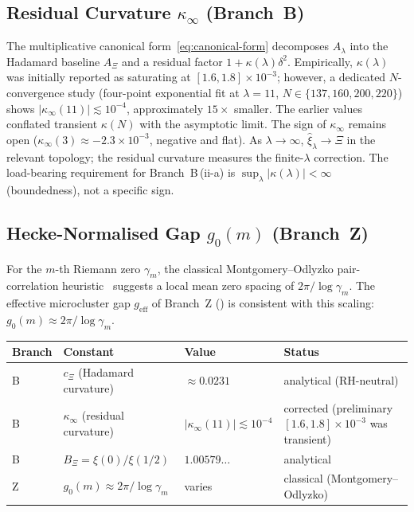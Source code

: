 \documentclass[12pt,a4paper]{article}
\theoremstyle{definition}
\theoremstyle{remark}
\begin{document}
\subsection{\texorpdfstring{Residual Curvature $\kappa_\infty$ (Branch~B)}{Residual Curvature kappa-infinity (Branch B)}}

The multiplicative canonical form~\eqref{eq:canonical-form} decomposes
$A_\lambda$ into the Hadamard baseline $A_\Xi$ and a residual factor
$1+\kappa(\lambda)\delta^2$. Empirically,
$\kappa(\lambda)$ was initially reported as saturating at
$[1.6,1.8]\times 10^{-3}$; however, a dedicated $N$-convergence study
(four-point exponential fit at $\lambda=11$, $N\in\{137,160,200,220\}$)
shows $|\kappa_\infty(11)|\lesssim 10^{-4}$, approximately $15\times$
smaller. The earlier values conflated transient $\kappa(N)$ with the
asymptotic limit. The sign of $\kappa_\infty$ remains open
($\kappa_\infty(3)\approx -2.3\times10^{-3}$, negative and flat).
As $\lambda\to\infty$, $\hat\xi_\lambda \to \Xi$ in the relevant
topology; the residual curvature measures the
finite-$\lambda$ correction. The load-bearing requirement for
Branch~B\,(ii-a) is $\sup_\lambda|\kappa(\lambda)|<\infty$
(boundedness), not a specific sign.

\subsection{\texorpdfstring{Hecke-Normalised Gap $g_0(m)$ (Branch~Z)}{Hecke-Normalised Gap g0(m) (Branch Z)}}

For the $m$-th Riemann zero $\gamma_m$, the classical
Montgomery--Odlyzko pair-correlation heuristic~\cite{Montgomery1973}
suggests a local mean zero spacing of
$2\pi/\log\gamma_m$. The effective microcluster gap
$g_{\text{eff}}$ of Branch~Z () is
consistent with this scaling:
$g_0(m) \approx 2\pi/\log\gamma_m$.

\begin{center}
\small
\renewcommand{\arraystretch}{1.2}
\begin{tabular}{llll}
\toprule
\textbf{Branch} & \textbf{Constant} & \textbf{Value} & \textbf{Status} \\
\midrule
B & $c_\Xi$ (Hadamard curvature) & $\approx 0.0231$ & analytical (RH-neutral) \\
B & $\kappa_\infty$ (residual curvature) & $|\kappa_\infty(11)|\lesssim 10^{-4}$ & corrected (preliminary $[1.6,1.8]\times10^{-3}$ was transient) \\
B & $B_\Xi = \xi(0)/\xi(1/2)$ & $1.00579\ldots$ & analytical \\
Z & $g_0(m) \approx 2\pi/\log\gamma_m$ & varies & classical (Montgomery--Odlyzko) \\
\bottomrule
\end{tabular}
\end{center}
\end{document}
